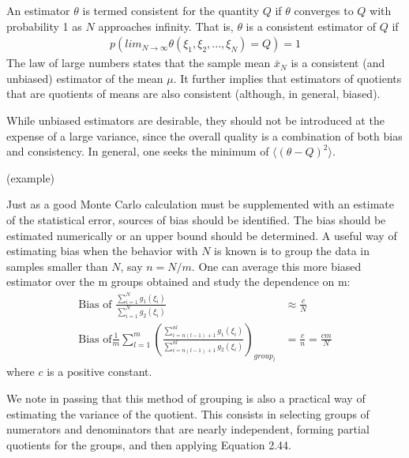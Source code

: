 \documentclass[twoside,english]{uiofysmaster}
\begin{document}
An estimator $\theta$ is termed consistent for the quantity $Q$ if $\theta$ converges to $Q$ with probability 1 as $N$ approaches infinity. That is, $\theta$ is a consistent estimator of $Q$ if 
\begin{align}
	p(lim_{N\rightarrow \infty} \theta (\xi_1, \xi_2, ..., \xi_N)=Q) =1 
\end{align}
The law of large numbers states that the sample mean $\bar{x}_N$ is a consistent (and unbiased) estimator of the mean $\mu$. It further implies that estimators of quotients that are quotients of means are also consistent (although, in general, biased).

While unbiased estimators are desirable, they should not be introduced at the expense of a large variance, since the overall quality is a combination of both bias and consistency. In general, one seeks the minimum of $\langle (\theta -Q)^2 \rangle$. 

(example)

Just as a good Monte Carlo calculation must be supplemented with an estimate of the statistical error, sources of bias should be identified. The bias should be estimated numerically or an upper bound should be determined. A useful way of estimating bias when the behavior with $N$ is known is to group the data in samples smaller than $N$, say $n=N/m$. One can average this more biased estimator over the m groups obtained and study the dependence on m:
\begin{align}
	\text{Bias of } \frac{\sum_{i=1}^N g_1 (\xi_i)}{\sum_{i=1}^N g_2 (\xi_i)}
	&\approx \frac{c}{N} \\
	\text{Bias of} \frac{1}{m} \sum_{l=1}^m (\frac{\sum_{i=n(l-1)+1}^{nl} g_1 (\xi_i)}
	{\sum_{i=n(l-1)+1}^{nl} g_2 (\xi_i)})_{group_l}
	&= \frac{c}{n} = \frac{cm}{N}
\end{align}
where $c$ is a positive constant.

We note in passing that this method of grouping is also a practical way of estimating the variance of the quotient. This consists in selecting groups of numerators and denominators that are nearly independent, forming partial quotients for the groups, and then applying Equation 2.44. \cite{Kalos2008}
\end{document}
